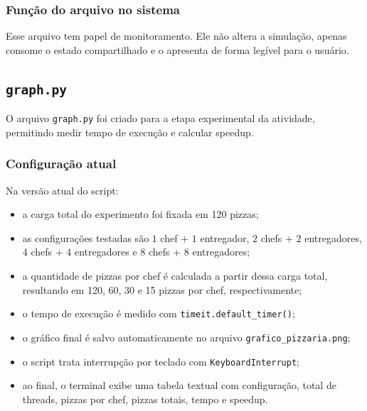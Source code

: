 \documentclass[12pt,a4paper]{article}
\begin{document}
\subsubsection{Fun\c{c}\~ao do arquivo no sistema}
Esse arquivo tem papel de monitoramento. Ele n\~ao altera a simula\c{c}\~ao, apenas consome o estado compartilhado e o apresenta de forma leg\'ivel para o usu\'ario.

\subsection{\texttt{graph.py}}
O arquivo \texttt{graph.py} foi criado para a etapa experimental da atividade, permitindo medir tempo de execu\c{c}\~ao e calcular speedup.

\subsubsection{Configura\c{c}\~ao atual}
Na vers\~ao atual do script:
\begin{itemize}
    \item a carga total do experimento foi fixada em 120 pizzas;
    \item as configura\c{c}\~oes testadas s\~ao \(1\) chef + \(1\) entregador, \(2\) chefs + \(2\) entregadores, \(4\) chefs + \(4\) entregadores e \(8\) chefs + \(8\) entregadores;
    \item a quantidade de pizzas por chef \'e calculada a partir dessa carga total, resultando em 120, 60, 30 e 15 pizzas por chef, respectivamente;
    \item o tempo de execu\c{c}\~ao \'e medido com \texttt{timeit.default\_timer()};
    \item o gr\'afico final \'e salvo automaticamente no arquivo \texttt{grafico\_pizzaria.png};
    \item o script trata interrup\c{c}\~ao por teclado com \texttt{KeyboardInterrupt};
    \item ao final, o terminal exibe uma tabela textual com configura\c{c}\~ao, total de threads, pizzas por chef, pizzas totais, tempo e speedup.
\end{itemize}
\end{document}
